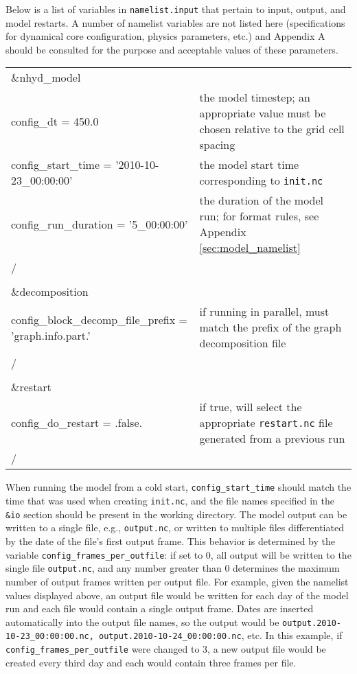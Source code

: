 Below is a list of variables in {\tt namelist.input} that pertain to input, output, and model restarts.  A number of namelist variables are not listed here (specifications for dynamical core configuration, physics parameters, etc.) and Appendix A should be consulted for the purpose and acceptable values of these parameters.

\begin{longtable}{p{3.0in} |p{3.25in}}

\&nhyd\_model                                        & \\
   config\_dt = 450.0                                & the model timestep; an appropriate value must be chosen relative to the grid cell spacing \\
   config\_start\_time = '2010-10-23\_00:00:00'      & the model start time corresponding to {\tt init.nc}\\
   config\_run\_duration = '5\_00:00:00'             & the duration of the model run; for format rules, see Appendix \ref{sec:model_namelist} \\
/                                                    & \\

\\
\&decomposition                                            & \\
   config\_block\_decomp\_file\_prefix = 'graph.info.part.' & if running in parallel, must match the prefix of the graph decomposition file \\
/                                                    & \\
\\
\&restart                                            & \\
   config\_do\_restart = .false.                     & if true, will select the appropriate {\tt restart.nc} file generated from a previous run \\
/ 
\end{longtable}

When running the model from a cold start, {\tt config\_start\_time} should match the time that was used when creating {\tt init.nc}, and the file names specified in the {\tt \&io} section should be present in the working directory.  The model output can be written to a single file, e.g., {\tt output.nc}, or written to multiple files differentiated by the date of the file's first output frame.  This behavior is determined by the variable {\tt config\_frames\_per\_outfile}: if set to 0, all output will be written to the single file {\tt output.nc}, and any number greater than 0 determines the maximum number of output frames written per output file.  For example, given the namelist values displayed above, an output file would be written for each day of the model run and each file would contain a single output frame.  Dates are inserted automatically into the output file names, so the output would be {\tt output.2010-10-23\_00:00:00.nc, output.2010-10-24\_00:00:00.nc}, etc.  In this example, if {\tt config\_frames\_per\_outfile} were changed to 3, a new output file would be created every third day and each would contain three frames per file.

